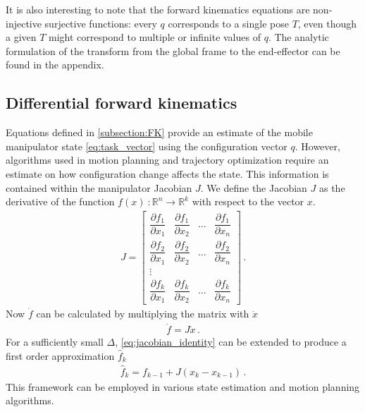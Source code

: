 \documentclass[times, utf8, diplomski, english]{fer}
\begin{document}
It is also interesting to note that the forward kinematics equations are non-injective surjective functions: 
every $q$ corresponds to a single pose $T$, even though a given $T$ might correspond to multiple or infinite values of $q$.
The analytic formulation of the transform from the global frame to the end-effector can be found in the appendix.

\subsection{Differential forward kinematics}
Equations defined in \autoref{subsection:FK} provide an estimate of the mobile manipulator state \eqref{eq:task_vector} using the configuration vector $q$. 
However, algorithms used in motion planning and trajectory optimization require an estimate on how configuration change affects the state.
This information is contained within the manipulator Jacobian $J$.
We define the Jacobian $J$ as the derivative of the function $f\left(x\right) \ : \mathbb{R}^n \rightarrow \mathbb{R}^k $ with respect to the vector $x$.
\begin{align}\label{eq:jacobian}
J =
\begin{bmatrix}
    \dfrac{\partial {f_1}}{\partial x_{1}}      & \dfrac{\partial {f}_{1}}{\partial x_{2}}  & \dots & \dfrac{\partial {f}_{1}}{\partial x_{n}}  \\
    \dfrac{\partial{f_2}}{\partial x_{1}}      & \dfrac{\partial {f}_{2}}{\partial x_{2}}  & \dots & \dfrac{\partial {f}_{2}}{\partial x_{n}} \\
    \vdots \\
    \dfrac{\partial {f_k}}{\partial x_{1}}      & \dfrac{\partial {f}_{k}}{\partial x_{2}}  & \dots & \dfrac{\partial {f}_{k}}{\partial x_{n}}
\end{bmatrix}\, .
\end{align}
Now $\dot{f}$ can be calculated by multiplying the matrix with $\dot{x}$
\begin{align} \label{eq:jacobian_identity}
\dot{f} = J \dot{x}\, .
\end{align}
For a sufficiently small $\Delta$, \eqref{eq:jacobian_identity} can be extended to produce a first order approximation $\hat{f}_k$ 
\begin{align} \label{eq:jacobian_estimate}
\hat{f}_k = f_{k-1} + J\left(x_{k} - x_{k-1}\right)\, .
\end{align}
This framework can be employed in various state estimation and motion planning algorithms.
\newpage
\end{document}
